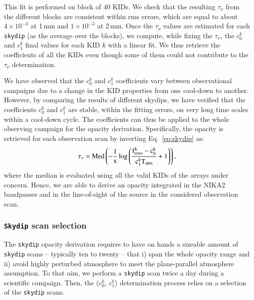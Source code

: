 \documentclass[traditionalabstract]{aa}
\newcommand{\taunu}{\tau_{\nu}}
\newcommand{\lp}[1]{#1}
\begin{document}
%
{\lp This fit is performed on block of 40 KIDs. We check that the
resulting $\taunu$ from the different blocks are consistent within rms
errors, which are equal to about $4\times 10^{-3}$ at 1\,mm and
$1\times 10^{-3}$ at 2\,mm.}
Once the $\taunu$ values are estimated for each {\tt skydip} (as the average over the
blocks), we compute, while fixing the $\taunu$, the $c_0^k$ and $c_1^k$
final values for each KID $k$ with a linear fit. We thus retrieve
the coefficients of all the KIDs even though some of them could not
contribute to the $\taunu$ determination. 

{\lp We have observed that the  $c_0^k$ and $c_1^k$ coefficients vary
between observational campaigns due to a change in the KID properties
from one cool-down to another.}
However, by comparing the results of different skydips, we have verified that the
coefficients $c_0^k$ and $c_1^k$ are stable, within the fitting errors, on very
long time scales within a cool-down cycle. The coefficients can thus be
applied to the whole observing campaign for the opacity derivation. %
Specifically, the opacity %
is retrieved for each observation scan by
inverting Eq.~\ref{eq:skydip} as:
\begin{equation}
\taunu =   \rm{Med}\left( -\frac{1}{x} \log\left( \frac{f_{\rm{reso}}^k - c_0^k}{c_1^kT_{\rm{atm}}} +1 \right)\right), 
\end{equation}
where the median is evaluated using all the valid
KIDs of the arrays under concern. Hence, we are able to derive an opacity
integrated in the NIKA2 bandpasses and in the line-of-sight of the
source in the considered observation scan.

\subsubsection{{\tt Skydip} scan selection}
\label{se:skydip-selection}

The {\tt skydip} opacity derivation requires to have on hands a
sizeable amount of {\tt skydip} scans --
typically ten to twenty -- that i) span the whole opacity range and
ii) avoid highly perturbed atmosphere to meet the plane-parallel
atmosphere assumption. To that aim, we perform a {\tt skydip}
scan twice a day during a scientific campaign. Then, the ($c_0^k$, $c_1^k$)
determination process relies on a selection of the {\tt skydip} scans.
\end{document}
